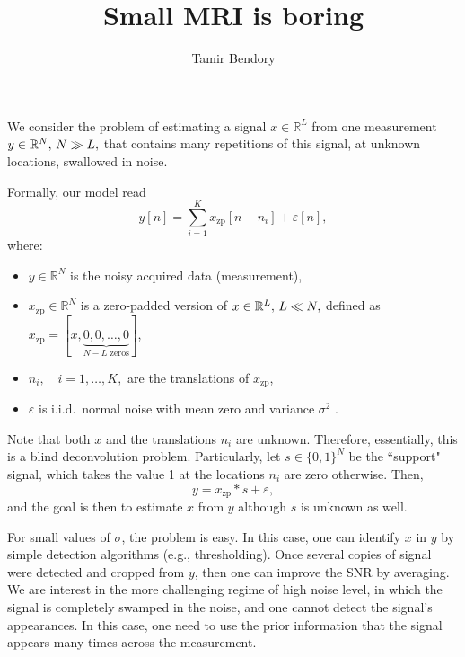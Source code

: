 \documentclass[12pt,a4paper]{article}
\theoremstyle{plain}
\theoremstyle{definition}
\theoremstyle{remark}
\theoremstyle{plain}
\theoremstyle{remark}
\theoremstyle{plain}
\theoremstyle{plain}
\newcommand{\RL}{\mathbb{R}^L}
\newcommand{\RN}{\mathbb{R}^N}
\newcommand{\xz}{x_{\textrm{zp}}}
\begin{document}


\title{Small MRI is boring}


\author{Tamir Bendory}
\maketitle

We consider the problem of estimating a signal $x\in\RL$ from one measurement $y\in\RN, \thinspace N\gg L,$ that contains many repetitions of this signal, at unknown locations, swallowed in noise. 

Formally, our model read
\begin{equation}
y[n] = \sum_{i=1}^K \xz [n-n_i] + \varepsilon[n], 
\end{equation}
where:
\begin{itemize}
	\item $y\in\RN$ is the noisy acquired data (measurement),
	\item $\xz\in\RN$ is a zero-padded version of $x\in\RL, \thinspace L\ll N,
	$ defined as $\xz  = [x, \underbrace{0,0,\ldots,0}_{N-L \text{ zeros}}]$,
	\item $n_i,\quad i=1,\ldots,K,$ are the translations of $\xz$, 
	\item  $\varepsilon$ is i.i.d.\ normal noise with mean zero and variance $\sigma^2$ .
\end{itemize}

Note that both $x$ and the translations $n_i$ are unknown. Therefore, essentially, this is a blind deconvolution problem. Particularly, let $s\in\{0,1\}^N$ be the ``support" signal, which takes the value 1 at the locations $n_i$ are zero otherwise. 
Then, 
\begin{equation}
y = \xz \ast s + \varepsilon,
\end{equation}
and the goal is then to estimate $x$ from $y$ although $s$ is unknown as well.

For small values of $\sigma$,  the problem is easy. In this case, one can identify $x$ in $y$ by simple detection algorithms (e.g., thresholding). Once several copies of  signal were detected and cropped from $y$, then one can  improve the SNR by averaging. We are interest in the more challenging regime of high noise level, in which the signal is completely swamped in the noise, and one cannot detect the signal's appearances. In this case, one need to use the prior information that the signal appears many times across the measurement.
 
\end{document}
